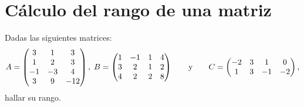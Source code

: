 \documentclass[a4,11pt]{aleph-notas}
\begin{document}
\encabezado

\section{Cálculo del rango de una matriz}


\begin{ejer}
    Dadas las siguientes matrices:
    \[
        A=
        \begin{pmatrix}
        3 & 1 & 3\\
        1 & 2 & 3\\
        -1 & -3 & 4\\
        3 & 9 & -12
        \end{pmatrix}
        , \hspace{0.1cm}
       B=
        \begin{pmatrix}
        1 & -1 & 1 & 4\\
        3 & 2 & 1 & 2\\
        4 & 2 & 2 & 8
        \end{pmatrix}
        \qquad\text{y}\qquad
        C=
        \begin{pmatrix}
        -2 & 3 & 1 &0\\
        1 & 3 & -1 & -2
        \end{pmatrix},
    \]
    hallar su rango.
\end{ejer}
\end{document}

